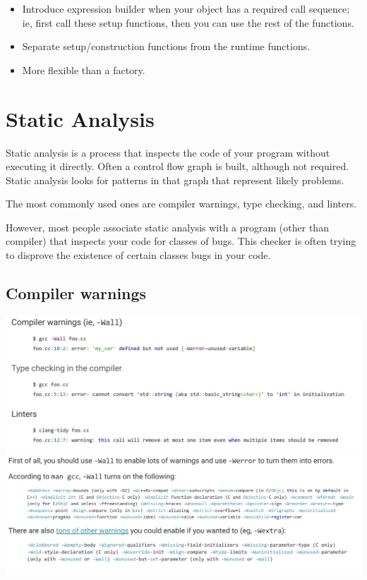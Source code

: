 \documentclass{article}
\begin{document}
\begin{center}
    \begin{itemize}
        \item Introduce expression builder when your object has a required call sequence; ie, first call these setup functions, then you can use the rest of the functions. 
        \item Separate setup/construction functions from the runtime functions. 
        \item More flexible than a factory.
    \end{itemize}
\end{center}


\pagebreak

\section{Static Analysis}

Static analysis is a process that inspects the code of your program without executing it directly. Often a control flow graph is built, although not required. Static analysis looks for patterns in that graph that represent likely problems.

\vspace*{1em}

The most commonly used ones are compiler warnings, type checking, and linters.

However, most people associate static analysis with a program (other than compiler) that inspects your code for classes of bugs. This checker is often trying to disprove the existence of certain classes bugs in your code. 

\vspace*{1em}

\subsection{Compiler warnings}

\includegraphics*[width=\linewidth]{staticAnalysis.png}
\includegraphics*[width=\linewidth]{staticAnalysis2.png}
\end{document}
